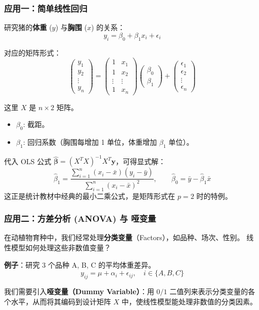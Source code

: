 
\begin{frame}
\frametitle{应用一：简单线性回归}

研究猪的\textbf{体重} ($y$) 与\textbf{胸围} ($x$) 的关系：
\[
y_i = \beta_0 + \beta_1 x_i + \epsilon_i
\]

对应的矩阵形式：
\[
\begin{pmatrix} y_1 \\ y_2 \\ \vdots \\ y_n \end{pmatrix} =
\begin{pmatrix}
1 & x_1 \\
1 & x_2 \\
\vdots & \vdots \\
1 & x_n
\end{pmatrix}
\begin{pmatrix} \beta_0 \\ \beta_1 \end{pmatrix} +
\begin{pmatrix} \epsilon_1 \\ \epsilon_2 \\ \vdots \\ \epsilon_n \end{pmatrix}
\]

这里 $X$ 是 $n \times 2$ 矩阵。
\begin{itemize}
    \item $\beta_0$: 截距。
    \item $\beta_1$: 回归系数（胸围每增加 1 单位，体重增加 $\beta_1$ 单位）。
\end{itemize}

\vspace{0.5em}
代入 OLS 公式 $\hat{\boldsymbol{\beta}} = (X^TX)^{-1}X^T\mathbf{y}$，可得显式解：
\[
\hat{\beta}_1 = \frac{\displaystyle\sum_{i=1}^n (x_i - \bar{x})(y_i - \bar{y})}{\displaystyle\sum_{i=1}^n (x_i - \bar{x})^2}, \qquad
\hat{\beta}_0 = \bar{y} - \hat{\beta}_1 \bar{x}
\]
这正是统计教材中经典的最小二乘公式，是矩阵形式在 $p=2$ 时的特例。

\end{frame}


\begin{frame}
\frametitle{应用二：方差分析 (ANOVA) 与 哑变量}

在动植物育种中，我们经常处理\textbf{分类变量}（Factors），如品种、场次、性别。
线性模型如何处理这些非数值变量？

\textbf{例子}：研究 3 个品种 A, B, C 的平均体重差异。
\[
y_{ij} = \mu + \alpha_i + \epsilon_{ij}, \quad i \in \{A, B, C\}
\]

我们需要引入\textbf{哑变量（Dummy Variable）}：用 $0/1$ 二值列来表示分类变量的各个水平，从而将其编码到设计矩阵 $X$ 中，使线性模型能处理非数值的分类因素。

\end{frame}

